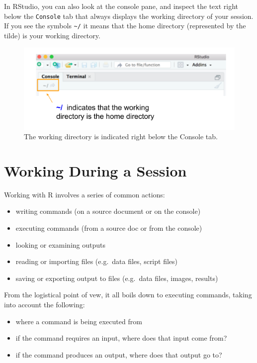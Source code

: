 \documentclass[
]{book}
\begin{document}
In RStudio, you can also look at the console pane, and inspect the text right
below the \texttt{Console} tab that always displays the working directory of your
session. If you see the symbols \texttt{\textasciitilde{}/} it means that the home directory
(represented by the tilde) is your working directory.

\begin{figure}

{\centering \includegraphics[width=0.7\linewidth]{images/rstudio/rstudio-console-working-directory} 

}

\caption{The working directory is indicated right below the Console tab.}\label{fig:unnamed-chunk-31}
\end{figure}

\hypertarget{working-during-a-session}{%
\section{Working During a Session}\label{working-during-a-session}}

Working with R involves a series of common actions:

\begin{itemize}
\item
  writing commands (on a source document or on the console)
\item
  executing commands (from a source doc or from the console)
\item
  looking or examining outputs
\item
  reading or importing files (e.g.~data files, script files)
\item
  saving or exporting output to files (e.g.~data files, images, results)
\end{itemize}

From the logistical point of vew, it all boils down to executing commands,
taking into account the following:

\begin{itemize}
\item
  where a command is being executed from
\item
  if the command requires an input, where does that input come from?
\item
  if the command produces an output, where does that output go to?
\end{itemize}
\end{document}
